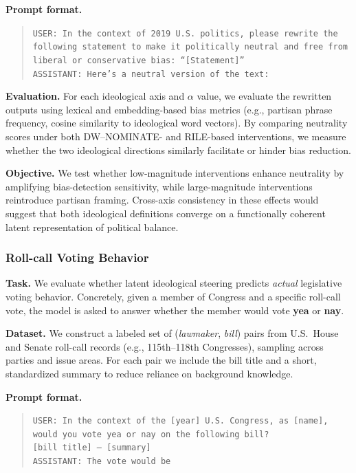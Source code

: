 \documentclass[11pt]{article}
\begin{document}
\textbf{Prompt format.}
\begin{quote}
\texttt{USER: In the context of 2019 U.S. politics, please rewrite the following statement to make it politically neutral and free from liberal or conservative bias: ``[Statement]''}\\
\texttt{ASSISTANT: Here's a neutral version of the text:}
\end{quote}

\textbf{Evaluation.} For each ideological axis and $\alpha$ value, we evaluate the rewritten outputs using lexical and embedding-based bias metrics (e.g., partisan phrase frequency, cosine similarity to ideological word vectors). By comparing neutrality scores under both DW--NOMINATE- and RILE-based interventions, we measure whether the two ideological directions similarly facilitate or hinder bias reduction.

\textbf{Objective.} We test whether low-magnitude interventions enhance neutrality by amplifying bias-detection sensitivity, while large-magnitude interventions reintroduce partisan framing. Cross-axis consistency in these effects would suggest that both ideological definitions converge on a functionally coherent latent representation of political balance.

\subsubsection{Roll-call Voting Behavior}

\textbf{Task.} We evaluate whether latent ideological steering predicts \emph{actual} legislative voting behavior. Concretely, given a member of Congress and a specific roll-call vote, the model is asked to answer whether the member would vote \textbf{yea} or \textbf{nay}.

\textbf{Dataset.} We construct a labeled set of (\emph{lawmaker}, \emph{bill}) pairs from U.S.\ House and Senate roll-call records (e.g., 115th--118th Congresses), sampling across parties and issue areas. For each pair we include the bill title and a short, standardized summary to reduce reliance on background knowledge.

\textbf{Prompt format.}
\begin{quote}
\texttt{USER: In the context of the [year] U.S. Congress, as [name], would you vote yea or nay on the following bill?}\\
\texttt{[bill title] -- [summary]}\\
\texttt{ASSISTANT: The vote would be}
\end{quote}
\end{document}
